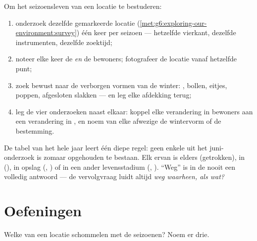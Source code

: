 \begin{method}\label{met:g6:life-through-seasons:yearsurvey}
Om het seizoensleven van een locatie te bestuderen:
\begin{enumerate}
  \item onderzoek dezelfde gemarkeerde locatie
        (\cref{met:g6:exploring-our-environment:survey}) één keer per
        seizoen --- hetzelfde vierkant, dezelfde instrumenten, dezelfde
        zoektijd;
  \item noteer elke keer de  \emph{en} de bewoners;
        fotografeer de locatie vanaf hetzelfde punt;
  \item zoek bewust naar de verborgen vormen van de winter: ,
        bollen, eitjes, poppen, afgesloten slakken --- en leg elke
        afdekking terug;
  \item leg de vier onderzoeken naast elkaar: koppel elke verandering in
        bewoners aan een verandering in , en noem van elke
        afwezige de wintervorm of de bestemming.
\end{enumerate}
\end{method}

\begin{remark}\label{rem:g6:life-through-seasons:vanish}
De tabel van het hele jaar leert één diepe regel: geen enkele  uit
het juni-onderzoek is zomaar opgehouden te bestaan. Elk ervan is elders
(getrokken), in  (), in opslag (, ) of in een
ander levensstadium (, ). ``Weg'' is in de  nooit een
volledig antwoord --- de vervolgvraag luidt altijd \emph{weg waarheen,
als wat?}
\end{remark}

\section{Oefeningen}

\begin{exercise}[$\star$]\label{exo:g6:life-through-seasons:1}
Welke  van een locatie schommelen met de seizoenen? Noem er
drie.
\end{exercise}

